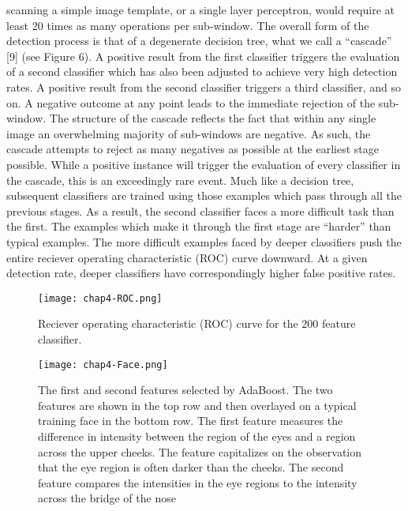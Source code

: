 \begin{compactitem}
scanning a simple image template, or a single layer perceptron, would require at
least 20 times as many operations per sub-window.
The overall form of the detection process is that of a degenerate decision tree, what
we call a “cascade” [9] (see Figure 6). A positive result from the first classifier triggers
the evaluation of a second classifier which has also been adjusted to achieve very high
detection rates. A positive result from the second classifier triggers a third classifier,
and so on. A negative outcome at any point leads to the immediate rejection of the
sub-window.
The structure of the cascade reflects the fact that within any single image an overwhelming
majority of sub-windows are negative. As such, the cascade attempts to
reject as many negatives as possible at the earliest stage possible. While a positive
instance will trigger the evaluation of every classifier in the cascade, this is an exceedingly
rare event.
Much like a decision tree, subsequent classifiers are trained using those examples
which pass through all the previous stages. As a result, the second classifier faces a
more difficult task than the first. The examples which make it through the first stage are
“harder” than typical examples. The more difficult examples faced by deeper classifiers
push the entire reciever operating characteristic (ROC) curve downward. At a given
detection rate, deeper classifiers have correspondingly higher false positive rates.

\begin{figure}[h]
  \centering
	\texttt{[image: chap4-ROC.png]}
  \caption{Reciever operating characteristic (ROC) curve for the 200 feature classifier.}
  \label{fig:chap4-ROC}
\end{figure}

\begin{figure}[h]
  \centering
	\texttt{[image: chap4-Face.png]}
  \caption{The first and second features selected by AdaBoost. The two features are
shown in the top row and then overlayed on a typical training face in the bottom row.
The first feature measures the difference in intensity between the region of the eyes and
a region across the upper cheeks. The feature capitalizes on the observation that the
eye region is often darker than the cheeks. The second feature compares the intensities
in the eye regions to the intensity across the bridge of the nose}
  \label{fig:chap4-Face}
\end{figure}



\end{compactitem}

